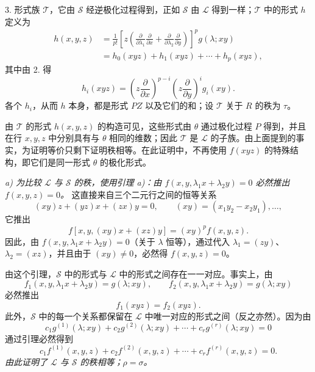 3. 形式族 $\mathcal T$，它由 $\mathcal S$ 经逆极化过程得到，正如 $\mathcal S$ 由 $\mathcal L$ 得到一样；$\mathcal T$ 中的形式 $h$ 定义为
\[
\begin{aligned}
 h(x,y,z)
 &=\frac1{p!}\left[z\left(\frac{\partial}{\partial\lambda_1}\frac{\partial}{\partial x}
 +\frac{\partial}{\partial\lambda_2}\frac{\partial}{\partial y}\right)\right]^p g(\lambda;xy)\\
 &=h_0(xyz)+h_1(xyz)+\cdots+h_p(xyz),
\end{aligned}
\]
其中由 2. 得
\[
  h_i(xyz)=
  \left(z\frac{\partial}{\partial x}\right)^{p-i}
  \left(z\frac{\partial}{\partial y}\right)^i g_i(xy).
\]
各个 $h_i$，从而 $h$ 本身，都是形式 $PZ$ 以及它们的和；设 $\mathcal T$ 关于 $R$ 的秩为 $\tau$。

由 $\mathcal T$ 的形式 $h(x,y,z)$ 的构造可见，这些形式由 $\theta$ 通过极化过程 $P$ 得到，并且在行 $x,y,z$ 中分别具有与 $\theta$ 相同的维数；因此 $\mathcal T$ 是 $\mathcal L$ 的子族。由上面提到的事实，为证明等价只剩下证明秩相等。在此证明中，不再使用 $f(xyz)$ 的特殊结构，即它们是同一形式 $\theta$ 的极化形式。

\emph{a) 为比较 $\mathcal L$ 与 $\mathcal S$ 的秩，使用引理 a)：由 $f(x,y,\lambda_1x+\lambda_2y)=0$ 必然推出 $f(x,y,z)=0$。} 这直接来自三个二元行之间的恒等关系
\[
  (xy)z+(yz)x+(zx)y=0,
  \qquad (xy)=(x_1y_2-x_2y_1),\ldots,
\]
它推出
\[
  f[x,y,(xy)x+(xz)y]=(xy)^p f(x,y,z).
\]
因此，由 $f(x,y,\lambda_1x+\lambda_2y)=0$（关于 $\lambda$ 恒等），通过代入 $\lambda_1=(zy)$、$\lambda_2=(xz)$，并且由于 $(xy)\ne0$，必然得 $f(x,y,z)=0$。

由这个引理，$\mathcal S$ 中的形式与 $\mathcal L$ 中的形式之间存在一一对应。事实上，由
\[
  f_1(x,y,\lambda_1x+\lambda_2y)=g(\lambda;xy),\qquad
  f_2(x,y,\lambda_1x+\lambda_2y)=g(\lambda;xy)
\]
必然推出
\[
  f_1(xyz)=f_2(xyz).
\]
此外，$\mathcal S$ 中的每一个关系都保留在 $\mathcal L$ 中唯一对应的形式之间（反之亦然）。因为由
\[
  c_1g^{(1)}(\lambda;xy)+c_2g^{(2)}(\lambda;xy)+\cdots+c_rg^{(r)}(\lambda;xy)=0
\]
通过引理必然得到
\[
  c_1f^{(1)}(x,y,z)+c_2f^{(2)}(x,y,z)+\cdots+c_rf^{(r)}(x,y,z)=0.
\]
\emph{由此证明了 $\mathcal L$ 与 $\mathcal S$ 的秩相等；$\rho=\sigma$。}

